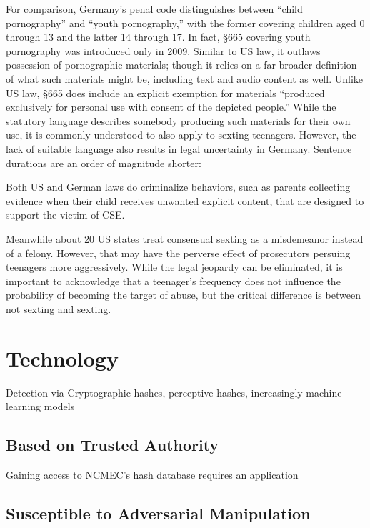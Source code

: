 \documentclass[nonacm,screen]{acmart}
\begin{document}
\begin{itemize}
For comparison, Germany's penal code distinguishes between ``child pornography''
and ``youth pornography,'' with the former covering children aged 0 through 13
and the latter 14 through 17. In fact, \S665 covering youth pornography was
introduced only in 2009. Similar to US law, it outlaws possession of
pornographic materials; though it relies on a far broader definition of what
such materials might be, including text and audio content as well. Unlike US
law, \S665 does include an explicit exemption for materials ``produced
exclusively for personal use with consent of the depicted people.'' While the
statutory language describes somebody producing such materials for their own
use, it is commonly understood to also apply to sexting teenagers. However, the
lack of suitable language also results in legal uncertainty in Germany. Sentence
durations are an order of magnitude shorter:

Both US and German laws do criminalize behaviors, such as parents collecting
evidence when their child receives unwanted explicit content, that are designed
to support the victim of CSE.

Meanwhile about 20 US states treat consensual sexting as a misdemeanor instead
of a felony. However, that may have the perverse effect of prosecutors persuing
teenagers more aggressively. While the legal jeopardy can be eliminated, it is
important to acknowledge that a teenager's frequency does not influence the
probability of becoming the target of abuse, but the critical difference is
between not sexting and sexting.


\section{Technology}




Detection via Cryptographic hashes, perceptive hashes, increasingly machine
learning models


\subsection{Based on Trusted Authority}

Gaining access to NCMEC's hash database requires an application



\subsection{Susceptible to Adversarial Manipulation}


\end{itemize}
\end{document}
